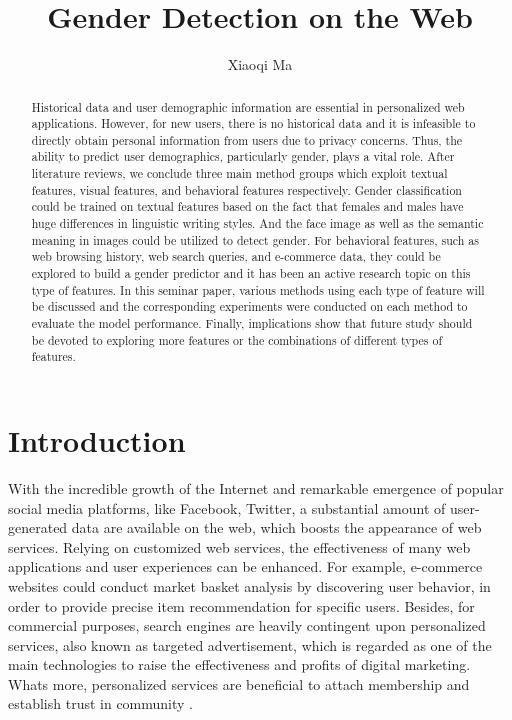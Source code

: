 \documentclass[runningheads]{llncs}
\begin{document}
	
	\title{Gender Detection on the Web}
	\author{Xiaoqi Ma}
	\maketitle  
	
	\begin{abstract}
		
		Historical data and user demographic information are essential in personalized web applications. However, for new users, there is no historical data and it is infeasible to directly obtain personal information from users due to privacy concerns. Thus, the ability to predict user demographics, particularly gender, plays a vital role. After literature reviews, we conclude three main method groups which exploit textual features, visual features, and behavioral features respectively. Gender classification could be trained on textual features based on the fact that females and males have huge differences in linguistic writing styles. And the face image as well as the semantic meaning in images could be utilized to detect gender. For behavioral features, such as web browsing history, web search queries, and e-commerce data, they could be explored to build a gender predictor and it has been an active research topic on this type of features. In this seminar paper, various methods using each type of feature will be discussed and the corresponding experiments were conducted on each method to evaluate the model performance. Finally, implications show that future study should be devoted to exploring more features or the combinations of different types of features. 
		
	\end{abstract}
	
	\section{Introduction}
	
	With the incredible growth of the Internet and remarkable emergence of popular social media platforms, like Facebook, Twitter, a substantial amount of user-generated data are available on the web, which boosts the appearance of web services. Relying on customized web services, the effectiveness of many web applications and user experiences can be enhanced. For example, e-commerce websites could conduct market basket analysis by discovering user behavior, in order to provide precise item recommendation for specific users. Besides, for commercial purposes, search engines are heavily contingent upon personalized services, also known as targeted advertisement, which is regarded as one of the main technologies to raise the effectiveness and profits of digital marketing. What\textquotesingle s more, personalized services are beneficial to attach membership and establish trust in community \cite{zhong2015you}.\\
	
\end{document}
